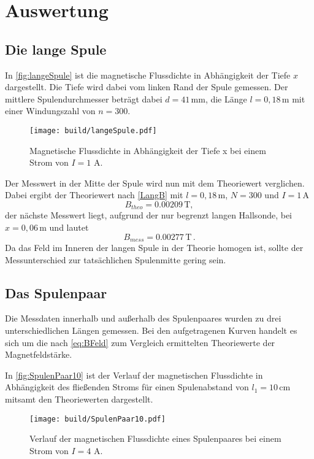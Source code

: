\section{Auswertung}
\label{sec:Auswertung}

\subsection{Die lange Spule}
\label{sec:langeSpule}
In \autoref{fig:langeSpule} ist die magnetische Flussdichte in Abhängigkeit der Tiefe $x$ dargestellt. Die Tiefe
wird dabei vom linken Rand der Spule gemessen. Der mittlere Spulendurchmesser beträgt dabei $d=41 \, \unit{\milli\meter}$, 
die Länge $l=0,18 \, \unit{\meter}$ mit einer Windungszahl von $n=300$.
\begin{figure}[H]
    \centering
    \texttt{[image: build/langeSpule.pdf]}
    \caption{Magnetische Flussdichte in Abhängigkeit der Tiefe x bei einem Strom von $I= 1 \, \, \unit{\ampere}$.}
    \label{fig:langeSpule}
  \end{figure}

Der Messwert in der Mitte der Spule wird nun mit dem Theoriewert verglichen.
Dabei ergibt der Theoriewert nach \eqref{LangB} mit $l=0,18 \, \unit{\meter}$, $N=300$ und $I= 1\, \unit{\ampere}$
\begin{equation*}
  B_{theo}= 0.00209 \, \unit{\tesla},
\end{equation*}
der nächste Messwert liegt, aufgrund der nur begrenzt langen Hallsonde, bei $x=0,06\, \unit{\meter}$ und lautet
\begin{equation*}
  B_{mess} = 0.00277 \, \unit{\tesla}\,.
\end{equation*}
Da das Feld im Inneren der langen Spule in der Theorie homogen ist, sollte der Messunterschied zur tatsächlichen Spulenmitte
gering sein. 

\newpage

\subsection{Das Spulenpaar}
\label{sec:Spulenpaar}
Die Messdaten innerhalb und außerhalb des Spulenpaares wurden zu drei unterschiedlichen Längen gemessen. 
Bei den aufgetragenen Kurven handelt es sich um die nach \eqref{eq:BFeld} zum Vergleich ermittelten Theoriewerte
der Magnetfeldstärke.

In \autoref{fig:SpulenPaar10} ist der Verlauf der magnetischen Flussdichte in Abhängigkeit des fließenden Stroms
für einen Spulenabstand von $l_1= 10 \, \unit{\centi\meter}$ mitsamt den Theoriewerten dargestellt.
  \begin{figure}[H]
    \centering
    \texttt{[image: build/SpulenPaar10.pdf]}
    \caption{Verlauf der magnetischen Flussdichte eines Spulenpaares bei einem Strom von $I= 4 \, \, \unit{\ampere}$.}
    \label{fig:SpulenPaar10}
  \end{figure}

